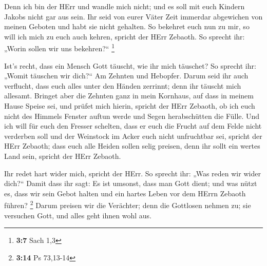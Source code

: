  Denn ich bin der HErr und wandle mich nicht; und es soll
mit euch Kindern Jakobs nicht gar aus sein.  Ihr seid von
eurer Väter Zeit immerdar abgewichen von meinen Geboten und habt sie
nicht gehalten. So bekehret euch nun zu mir, so will ich mich zu euch
auch kehren, spricht der HErr Zebaoth. So sprecht ihr: „Worin sollen wir
uns bekehren?{}`` \footnote{\textbf{3:7} Sach 1,3}

 Ist's recht, dass ein Mensch Gott täuscht, wie ihr mich
täuschet? So sprecht ihr: „Womit täuschen wir dich?{}`` Am Zehnten und
Hebopfer.  Darum seid ihr auch verflucht, dass euch alles
unter den Händen zerrinnt; denn ihr täuscht mich allesamt. 
Bringet aber die Zehnten ganz in mein Kornhaus, auf dass in meinem Hause
Speise sei, und prüfet mich hierin, spricht der HErr Zebaoth, ob ich
euch nicht des Himmels Fenster auftun werde und Segen herabschütten die
Fülle.  Und ich will für euch den Fresser schelten, dass er
euch die Frucht auf dem Felde nicht verderben soll und der Weinstock im
Acker euch nicht unfruchtbar sei, spricht der HErr Zebaoth;
 dass euch alle Heiden sollen selig preisen, denn ihr sollt
ein wertes Land sein, spricht der HErr Zebaoth.

 Ihr redet hart wider mich, spricht der HErr. So sprecht
ihr: „Was reden wir wider dich?{}``  Damit dass ihr sagt:
Es ist umsonst, dass man Gott dient; und was nützt es, dass wir sein
Gebot halten und ein hartes Leben vor dem HErrn Zebaoth führen?
\footnote{\textbf{3:14} Ps 73,13-14}  Darum preisen wir die
Verächter; denn die Gottlosen nehmen zu; sie versuchen Gott, und alles
geht ihnen wohl aus.

